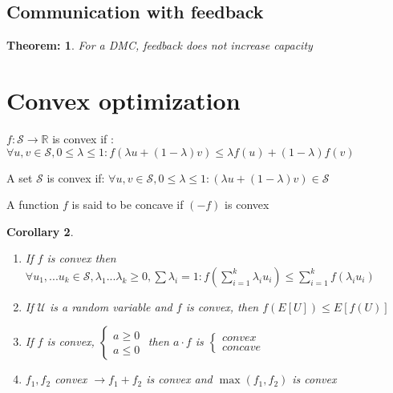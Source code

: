 \documentclass[11pt, a4paper]{scrartcl}
\newtheorem{theorem}{Theorem:}[section]
\newtheorem{corollary}[theorem]{Corollary}
\newenvironment{definition}[1][Definition]{\begin{trivlist}
\item[\hskip \labelsep {\bfseries #1}]}{\end{trivlist}}
\begin{document}
\subsection{Communication with feedback}
\begin{theorem} 
For a DMC, feedback does not increase capacity
\end{theorem}

\section{Convex optimization}

\begin{definition}[Convex function]  $f:\mathcal S\to \mathbb R$ is convex if : $\forall u,v \in \mathcal S, 0\leq \lambda \leq 1 : f(\lambda u + (1- \lambda)v) \leq \lambda f(u) + (1-\lambda)f(v) $
\end{definition}

\begin{definition}[Convex Set] A set $\mathcal S$ is convex if: $\forall u,v \in \mathcal S, 0\leq \lambda \leq 1 : (\lambda u + (1- \lambda)v) \in \mathcal S$
\end{definition}

\begin{definition} [Concave function] A function $f$ is said to be concave if $(-f)$ is convex \end{definition}

\begin{corollary} 
\begin{enumerate}
\item If $f$ is convex then $\forall u_1,...u_k \in \mathcal S, \lambda_1... \lambda_k \geq 0 , \sum \lambda_i = 1: f(\sum_{i=1}^k \lambda_i u_i ) \leq  \sum_{i=1}^k f(\lambda_i u_i )$
\item If $\mathcal U$ is a random variable and $f$ is convex, then $f(E[ U]) \leq E[f(U)] $ 
\item If $f$ is convex, $\left\{\begin{matrix} a\geq 0\\ a\leq 0 \end{matrix}\right. $ then $a\cdot f$ is $ \left\{\begin{matrix} convex\\concave\end{matrix}\right. $
\item $f_1,f_2$ convex $\to f_1 + f_2 $ is convex  and $\max (f_1, f_2)$ is convex
\end{enumerate}

\end{corollary}
\end{document}
